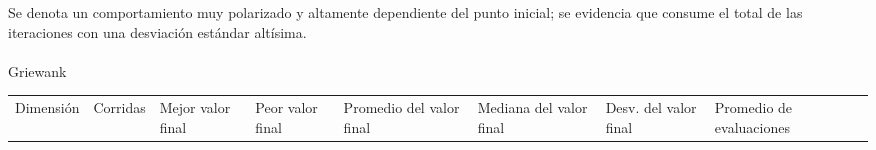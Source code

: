 \documentclass[
  12pt,
  letterpaper,
  DIV=11,
  numbers=noendperiod]{scrartcl}
\makeatletter
\let\oldparagraph\paragraph
\renewcommand{\paragraph}{
    \@ifstar
      \xxxParagraphStar
      \xxxParagraphNoStar
  }
\newcommand{\xxxParagraphStar}[1]{\oldparagraph*{#1}\mbox{}}
\newcommand{\xxxParagraphNoStar}[1]{\oldparagraph{#1}\mbox{}}
\newcounter{none} %
\makeatother
\begin{document}
Se denota un comportamiento muy polarizado y altamente dependiente del
punto inicial; se evidencia que consume el total de las iteraciones con
una desviación estándar altísima.

\paragraph{Griewank}\label{griewank-1}

{\def\LTcaptype{none} %
\begin{longtable}[]{@{}
  >{\raggedleft\arraybackslash}p{}
  >{\raggedleft\arraybackslash}p{}
  >{\raggedleft\arraybackslash}p{}
  >{\raggedleft\arraybackslash}p{}
  >{\raggedleft\arraybackslash}p{}
  >{\raggedleft\arraybackslash}p{}
  >{\raggedleft\arraybackslash}p{}
  >{\raggedleft\arraybackslash}p{}
  >{\raggedleft\arraybackslash}p{}@{}}
\toprule\noalign{}
\begin{minipage}[b]{\linewidth}\raggedleft
Dimensión
\end{minipage} & \begin{minipage}[b]{\linewidth}\raggedleft
Corridas
\end{minipage} & \begin{minipage}[b]{\linewidth}\raggedleft
Mejor valor final
\end{minipage} & \begin{minipage}[b]{\linewidth}\raggedleft
Peor valor final
\end{minipage} & \begin{minipage}[b]{\linewidth}\raggedleft
Promedio del valor final
\end{minipage} & \begin{minipage}[b]{\linewidth}\raggedleft
Mediana del valor final
\end{minipage} & \begin{minipage}[b]{\linewidth}\raggedleft
Desv. del valor final
\end{minipage} & \begin{minipage}[b]{\linewidth}\raggedleft
Promedio de evaluaciones
\end{minipage} & \begin{minipage}[b]{\linewidth}\raggedleft

\end{minipage}
\end{longtable}}
\end{document}
